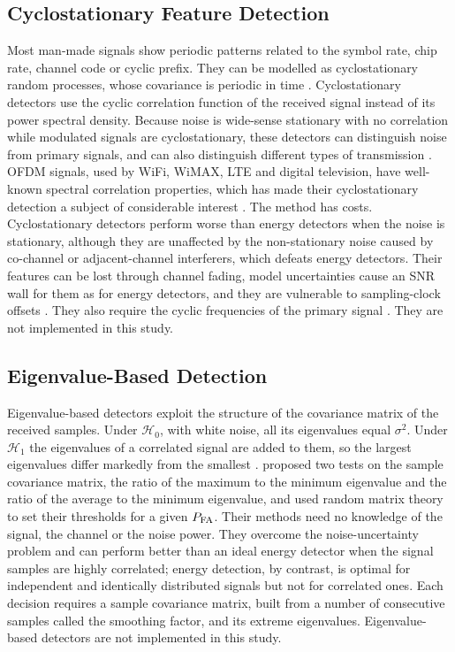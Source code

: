 \subsection{Cyclostationary Feature Detection}
\label{sec:cyclo}

Most man-made signals show periodic patterns related to the symbol rate, chip rate, channel code or cyclic prefix. They can be modelled as cyclostationary random processes, whose covariance is periodic in time \parencite[p.~323]{axell2010}. Cyclostationary detectors use the cyclic correlation function of the received signal instead of its power spectral density. Because noise is wide-sense stationary with no correlation while modulated signals are cyclostationary, these detectors can distinguish noise from primary signals, and can also distinguish different types of transmission \parencite[p.~122]{yucek2009}. OFDM signals, used by WiFi, WiMAX, LTE and digital television, have well-known spectral correlation properties, which has made their cyclostationary detection a subject of considerable interest \parencite[p.~323]{axell2010}. The method has costs. Cyclostationary detectors perform worse than energy detectors when the noise is stationary, although they are unaffected by the non-stationary noise caused by co-channel or adjacent-channel interferers, which defeats energy detectors. Their features can be lost through channel fading, model uncertainties cause an SNR wall for them as for energy detectors, and they are vulnerable to sampling-clock offsets \parencite[p.~124]{yucek2009}. They also require the cyclic frequencies of the primary signal \parencite{zeng2009}. They are not implemented in this study.

\subsection{Eigenvalue-Based Detection}
\label{sec:eigen}

Eigenvalue-based detectors exploit the structure of the covariance matrix of the received samples. Under $\mathcal{H}_0$, with white noise, all its eigenvalues equal $\sigma^2$. Under $\mathcal{H}_1$ the eigenvalues of a correlated signal are added to them, so the largest eigenvalues differ markedly from the smallest \parencite[p.~324]{axell2010}. \Textcite{zeng2009} proposed two tests on the sample covariance matrix, the ratio of the maximum to the minimum eigenvalue and the ratio of the average to the minimum eigenvalue, and used random matrix theory to set their thresholds for a given $P_{\mathrm{FA}}$. Their methods need no knowledge of the signal, the channel or the noise power. They overcome the noise-uncertainty problem and can perform better than an ideal energy detector when the signal samples are highly correlated; energy detection, by contrast, is optimal for independent and identically distributed signals but not for correlated ones. Each decision requires a sample covariance matrix, built from a number of consecutive samples called the smoothing factor, and its extreme eigenvalues. Eigenvalue-based detectors are not implemented in this study.

